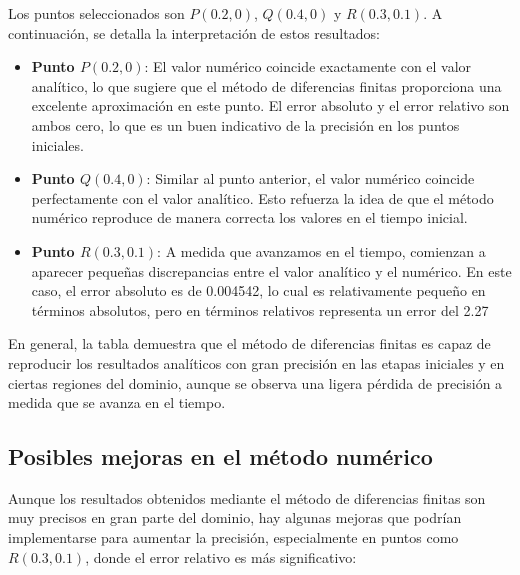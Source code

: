 Los puntos seleccionados son \(P(0.2, 0)\), \(Q(0.4, 0)\) y \(R(0.3, 0.1)\). A continuación, se detalla la interpretación de estos resultados:

\begin{itemize}
    \item \textbf{Punto \(P(0.2, 0)\)}: El valor numérico coincide exactamente con el valor analítico, lo que sugiere que el método de diferencias finitas proporciona una excelente aproximación en este punto. El error absoluto y el error relativo son ambos cero, lo que es un buen indicativo de la precisión en los puntos iniciales.
    
    \item \textbf{Punto \(Q(0.4, 0)\)}: Similar al punto anterior, el valor numérico coincide perfectamente con el valor analítico. Esto refuerza la idea de que el método numérico reproduce de manera correcta los valores en el tiempo inicial.
    
    \item \textbf{Punto \(R(0.3, 0.1)\)}: A medida que avanzamos en el tiempo, comienzan a aparecer pequeñas discrepancias entre el valor analítico y el numérico. En este caso, el error absoluto es de 0.004542, lo cual es relativamente pequeño en términos absolutos, pero en términos relativos representa un error del 2.27%
\end{itemize}

En general, la tabla demuestra que el método de diferencias finitas es capaz de reproducir los resultados analíticos con gran precisión en las etapas iniciales y en ciertas regiones del dominio, aunque se observa una ligera pérdida de precisión a medida que se avanza en el tiempo.

\subsection{Posibles mejoras en el método numérico}

Aunque los resultados obtenidos mediante el método de diferencias finitas son muy precisos en gran parte del dominio, hay algunas mejoras que podrían implementarse para aumentar la precisión, especialmente en puntos como \(R(0.3, 0.1)\), donde el error relativo es más significativo:

